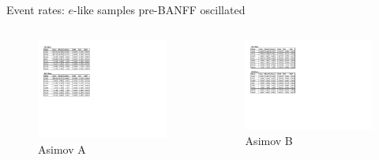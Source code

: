 \documentclass{beamer}
\begin{document}
\begin{frame}{Event rates: $e$-like samples pre-BANFF oscillated}
	\centering

	\begin{columns}
		\begin{column}{0.5\paperwidth}
			\begin{figure}
				\includegraphics[page=2, trim={0cm 8cm 13cm 1cm}, clip, scale=0.52] {images/rates/prefit_A}
				\caption{Asimov A}
			\end{figure}
		\end{column}
		\begin{column}{0.5\paperwidth}
			\begin{figure}
				\includegraphics[page=2, trim={0cm 6.5cm 13cm 2.0cm}, clip, scale=0.52] {images/rates/prefit_B}
				\caption{Asimov B}
			\end{figure}
		\end{column}
	\end{columns}
\end{frame}
\end{document}
